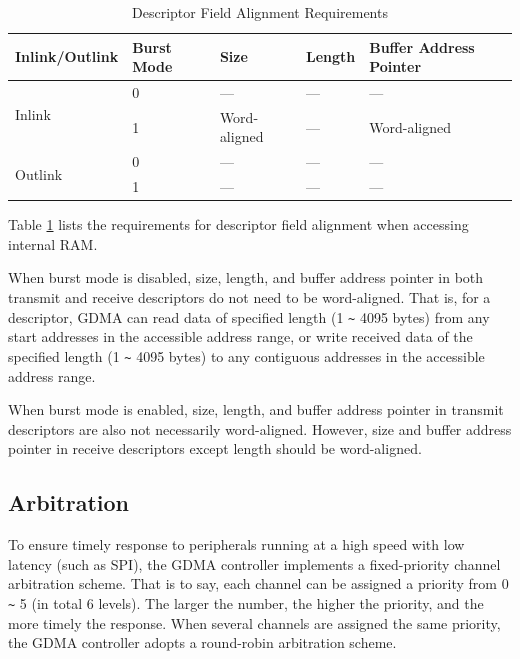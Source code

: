 \documentclass[main\_\_EN.tex]{subfiles}
\begin{document}
\begin{longtable}[c]{ | l | l | l | l | l | }
    \caption{Descriptor Field Alignment Requirements}
    \label{tab:gdma-inter-desc-param-align}
    \\\hline
    \rowcolor{lightgray}
    \textbf{Inlink/Outlink} & \textbf{Burst Mode} & \textbf{Size} & \textbf{Length} & \textbf{Buffer Address Pointer} \\\hline

    \multirow{2}{*}{Inlink}  & 0  & --- & ---  & --- \\\cline{2-5}
     & 1 & Word-aligned   & ---  & Word-aligned \\\hline
    \multirow{2}{*}{Outlink} & 0  & --- & ---  & --- \\\cline{2-5}
     & 1 & --- & ---  & --- \\\hline
\end{longtable}

Table \ref{tab:gdma-inter-desc-param-align} lists the requirements for descriptor field alignment when accessing internal RAM.

When burst mode is disabled, size, length, and buffer address pointer in both transmit and receive descriptors do not need to be word-aligned. That is, for a descriptor, GDMA can read data of specified length (1 \verb+~+ 4095 bytes) from any start addresses in the accessible address range, or write received data of the specified length (1 \verb+~+ 4095 bytes) to any contiguous addresses in the accessible address range.

When burst mode is enabled, size, length, and buffer address pointer in transmit descriptors are also not necessarily word-aligned. However, size and buffer address pointer in receive descriptors except length should be word-aligned.

\subsection{Arbitration}

To ensure timely response to peripherals running at a high speed with low latency (such as SPI), the GDMA controller implements a fixed-priority channel arbitration scheme. That is to say, each channel can be assigned a priority from 0 \verb+~+ 5 (in total 6 levels). The larger the number, the higher the priority, and the more timely the response. When several channels are assigned the same priority, the GDMA controller adopts a round-robin arbitration scheme.
\end{document}

